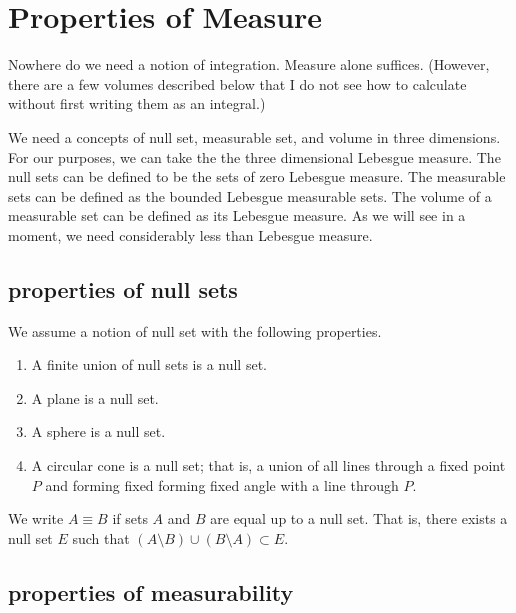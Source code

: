 
\section{Properties of Measure}

Nowhere do we need a notion
of integration.  Measure alone suffices.  (However, there are a few
volumes described below that I do not see how to calculate without
first writing them as an integral.)

We need a concepts of null set, measurable set, and volume in
three dimensions.  For our purposes, we can take the
the three dimensional Lebesgue measure.   
The null sets can be defined
to be the sets of zero Lebesgue measure. The measurable sets can
be defined as the bounded Lebesgue measurable sets.  The volume of
a measurable set can be defined as its Lebesgue measure.
As we will see in a moment, we need considerably less than Lebesgue measure.



\subsection{properties of null sets}\label{sec:null}

We assume a notion of null set with the following
properties.

\begin{enumerate}%
\item A finite union of null sets is a null set.\\
 \item A plane is a null set.\\
 \item A sphere is a null set.\\
 \item A circular cone is a null set; that is, a union of all
  lines through a fixed point $P$ and forming fixed
 forming fixed angle with a line through $P$.
\end{enumerate}

We write $A\equiv B$ if sets $A$ and $B$ are equal up to a null set.
That is, there exists a null set $E$ such that
   $(A\setminus B) \cup (B\setminus A) \subset E$.

\subsection{properties of measurability}\label{sec:measure}

